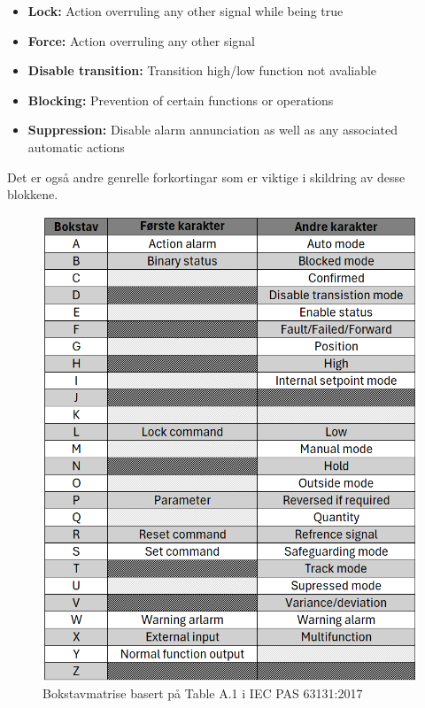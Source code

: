 \begin{itemize}
    \item \textbf{Lock:} Action overruling any other signal while being true
    \item \textbf{Force:} Action overruling any other signal                        
    \item \textbf{Disable transition:} Transition high/low function not avaliable  
    \item \textbf{Blocking:} Prevention of certain functions or operations          
    \item \textbf{Suppression:} Disable alarm annunciation as well as any associated automatic actions
\end{itemize}
Det er også andre genrelle forkortingar som er viktige i skildring av desse blokkene.
\begin{figure}[htbp]
    \centering
    \includegraphics[scale=0.33]{Figurar/IEC bokstavmatrise.png}
    \caption{Bokstavmatrise basert på Table A.1 i \gls{IEC} \gls{PAS} 63131:2017 \citep{A1}}\label{fig:SBE tilstandsmaskin}
\end{figure}

